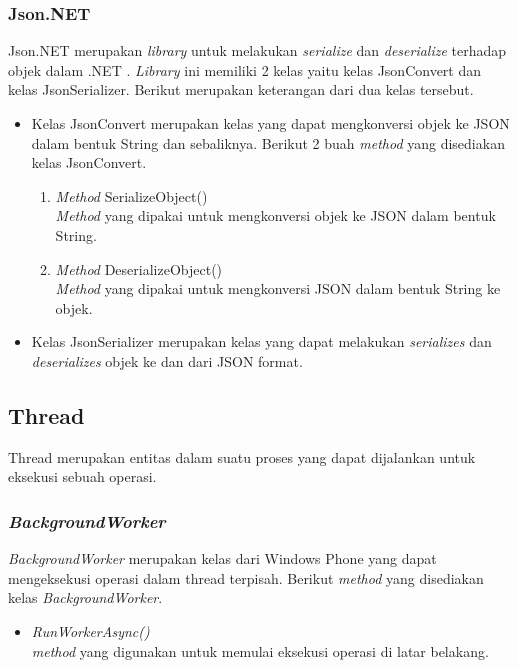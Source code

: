 \subsubsection{Json.NET}
\label{subsubsec:Json.NET}
\hspace{0.5cm} Json.NET merupakan \textit{library} untuk melakukan \textit{serialize} dan \textit{deserialize} terhadap objek dalam .NET \cite{jsonNet}. \textit{Library} ini memiliki 2 kelas yaitu kelas JsonConvert dan kelas JsonSerializer. Berikut merupakan keterangan dari dua kelas tersebut.
\begin{itemize}
	\item Kelas JsonConvert merupakan kelas yang dapat mengkonversi objek ke JSON dalam bentuk String dan sebaliknya. Berikut 2 buah \textit{method} yang disediakan kelas JsonConvert. \\
		\begin{enumerate}
			\item \textit{Method} SerializeObject() \\
			\textit{Method} yang dipakai untuk mengkonversi objek ke JSON dalam bentuk String.
			\item \textit{Method} DeserializeObject()\\
			\textit{Method} yang dipakai untuk mengkonversi JSON dalam bentuk String ke objek.
		\end{enumerate}
	\item Kelas JsonSerializer merupakan kelas yang dapat melakukan \textit{serializes} dan \textit{deserializes} objek ke dan dari JSON format.
\end{itemize}

\subsection{Thread}
\label{subsec:Thread}
\hspace{0.5cm} Thread merupakan entitas dalam suatu proses yang dapat dijalankan untuk eksekusi sebuah operasi. 

\subsubsection{\textit{BackgroundWorker}}
\label{subsubsec:BackgroundWorker}
\hspace{0.5cm} \textit{BackgroundWorker} merupakan kelas dari Windows Phone yang dapat mengeksekusi operasi dalam thread terpisah. Berikut \textit{method} yang disediakan kelas \textit{BackgroundWorker}.
\begin{itemize}
	\item \textit{RunWorkerAsync()} \\
	\textit{method} yang digunakan untuk memulai eksekusi operasi di latar belakang.
\end{itemize}

